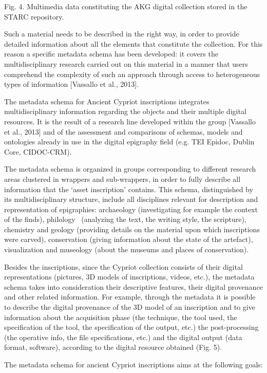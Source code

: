 \documentclass[amsthm,ebook]{saparticle}
\begin{document}
Fig. 4. Multimedia data constituting the AKG digital collection stored in the STARC repository.

Such a material needs to be described in the right way, in order to provide detailed information about all the elements
that constitute the collection. For this reason a specific metadata schema has been developed: it covers the
multidisciplinary research carried out on this material in a manner that users comprehend the complexity of such an
approach through access to heterogeneous types of information [Vassallo et al., 2013].

The metadata schema for Ancient Cypriot inscriptions integrates multidisciplinary information regarding the objects and
their multiple digital resources. It is the result of a research line developed within the group [Vassallo et al.,
2013] and of the assessment and comparisons of schemas, models and ontologies already in use in the digital epigraphy
field (e.g. TEI Epidoc, Dublin Core, CIDOC-CRM). 

The metadata schema is organized in groups corresponding to different research areas clustered in wrappers and
sub-wrappers, in order to fully describe all information that the ‘asset inscription’ contains. This schema,
distinguished by its multidisciplinary structure, include all disciplines relevant for description and representation
of epigraphies: archaeology (investigating for example the context of the finds), philology \ (analyzing the text, the
writing style, the scripture), chemistry and geology (providing details on the material upon which inscriptions were
carved), conservation (giving information about the state of the artefact), visualization and museology (about the
museums and places of conservation).

Besides the inscriptions, since the Cypriot collection consists of their digital representations (pictures, 3D models of
inscriptions, videos, etc.), the metadata schema takes into consideration their descriptive features, their digital
provenance and other related information. For example, through the metadata it is possible to describe the digital
provenance of the 3D model of an inscription and to give information about the acquisition phase (the technique, the
tool used, the specification of the tool, the specification of the output, etc.) the post-processing (the operative
info, the file specifications, etc.) and the digital output (data format, software), according to the digital resource
obtained (Fig. 5).

The metadata schema for ancient Cypriot inscriptions aims at the following goals:
\end{document}
